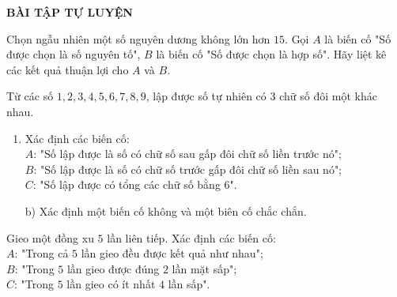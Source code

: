 \begin{center}
	\textbf{BÀI TẬP TỰ LUYỆN}
\end{center}
\begin{bt}\label{btsnt}%
	Chọn ngẫu nhiên một số nguyên dương không lớn hơn $15$. Gọi $A$ là biến cố "Số được chọn là số nguyên tố", $B$ là biến cố "Số được chọn là hợp số". Hãy liệt kê các kết quả thuận lợi cho $A$ và $B$.
\end{bt}
\begin{bt}%
	Từ các số $1,2,3,4,5,6,7,8,9$, lập được số tự nhiên có $3$ chữ số đôi một khác nhau.
	\begin{enumerate}
		\item Xác định các biến cố:\\
			$A$: "Số lập được là số có chữ số sau gấp đôi chữ số liền  trước nó";\\
			$B$: "Số lập được là số có chữ số trước gấp đôi chữ số liền sau nó";\\
			$C$: "Số lập được có tổng các chữ số bằng $6$".
		\item[b)] Xác định một biến cố không và một biên cố chắc chắn.
	\end{enumerate}
\end{bt}
\begin{bt}%
	Gieo một đồng xu $5$ lần liên tiếp. Xác định các biến cố:\\
	\indent $A$: "Trong cả $5$ lần gieo đều được kết quả như nhau";\\
	\indent $B$: "Trong $5$ lần gieo được đúng $2$ lần mặt sấp";\\
	\indent $C$: "Trong $5$ lần gieo có ít nhất $4$ lần sấp".
\end{bt}
